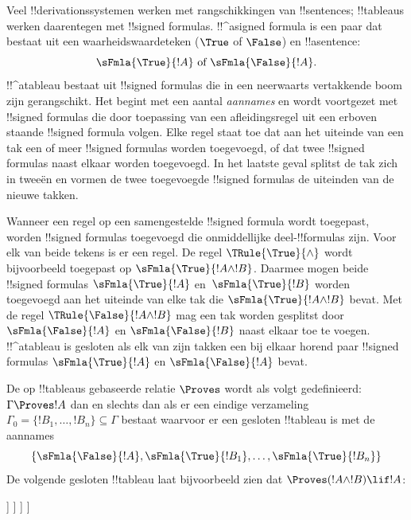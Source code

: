 \documentclass[../../../include/open-logic-section]{subfiles}
\begin{document}
      {}
      {}


Veel !!{derivation}ssystemen werken met rangschikkingen van
!!{sentence}s; !!{tableau}s werken daarentegen met !!{signed formula}s.
!!^a{signed formula} is een paar dat bestaat uit een
waarheidswaardeteken ($\True$ of $\False$) en !!a{sentence}:
\[
\sFmla{\True}{!A} \text{ of } \sFmla{\False}{!A}.
\]
!!^a{tableau} bestaat uit !!{signed formula}s die in een neerwaarts
vertakkende boom zijn gerangschikt. Het begint met een aantal
\emph{aannames} en wordt voortgezet met !!{signed formula}s die door
toepassing van een afleidingsregel uit een erboven staande
!!{signed formula} volgen. Elke regel staat toe dat aan het uiteinde
van een tak een of meer !!{signed formula}s worden toegevoegd, of dat
twee !!{signed formula}s naast elkaar worden toegevoegd. In het
laatste geval splitst de tak zich in tweeën en vormen de twee
toegevoegde !!{signed formula}s de uiteinden van de nieuwe takken.

Wanneer een regel op een samengestelde !!{signed formula} wordt
toegepast, worden !!{signed formula}s toegevoegd die onmiddellijke
deel-!!{formula}s zijn. Voor elk van beide tekens is er een regel. De
regel $\TRule{\True}{\land}$ wordt bijvoorbeeld toegepast op
$\sFmla{\True}{!A \land !B}$. Daarmee mogen beide !!{signed formula}s
$\sFmla{\True}{!A}$ en~$\sFmla{\True}{!B}$ worden toegevoegd aan het
uiteinde van elke tak die $\sFmla{\True}{!A \land !B}$ bevat. Met de
regel $\TRule{\False}{!A \land !B}$ mag een tak worden gesplitst door
$\sFmla{\False}{!A}$ en $\sFmla{\False}{!B}$ naast elkaar toe te
voegen. !!^a{tableau} is gesloten als elk van zijn takken een bij
elkaar horend paar !!{signed formula}s $\sFmla{\True}{!A}$ en
$\sFmla{\False}{!A}$ bevat.

De op !!{tableau}s gebaseerde relatie $\Proves$ wordt als volgt
gedefinieerd: $\Gamma \Proves !A$ dan en slechts dan als er een eindige
verzameling~$\Gamma_0 = \{!B_1, \dots, !B_n\} \subseteq \Gamma$ bestaat
waarvoor er een gesloten !!{tableau} is met de aannames
\[
\{\sFmla{\False}{!A}, \sFmla{\True}{!B_1}, \dots, \sFmla{\True}{!B_n}\} 
\]
De volgende gesloten !!{tableau} laat bijvoorbeeld zien dat $\Proves
(!A \land !B) \lif !A$:
\begin{oltableau}
  [\sFmla{\False}{(\formula{A} \land \formula{B}) \lif \formula{A}}, just = \TAss
    [\sFmla{\True}{\formula{A} \land \formula{B}}, just = {\TRule{\False}{\lif}[1]}
      [\sFmla{\False}{\formula{A}}, just = {\TRule{\False}{\lif}[1]}
        [\sFmla{\True}{\formula{A}}, just = {\TRule{\True}{\lif}[2]}
          [\sFmla{\True}{\formula{B}}, just = {\TRule{\True}{\lif}[2]}, close]
        ]
      ]
    ]
  ]
\end{oltableau}
\end{document}
